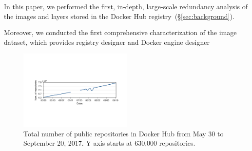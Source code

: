 
In this paper, we performed the first, in-depth, large-scale 
redundancy analysis of the images and layers stored in the Docker Hub
registry~(\S\ref{sec:background}).
%

Moreover, we conducted the first comprehensive characterization of the image dataset, which provides registry designer and Docker engine designer   



\begin{figure}
	\centering
	\includegraphics[width=0.5\textwidth]{graphs/image_growth.pdf}
	\caption{Total number of public repositories in Docker Hub
		from May 30 to September 20, 2017. Y axis starts
		at 630,000 repositories.
	}
	\label{fig_image_growth}
\end{figure}

